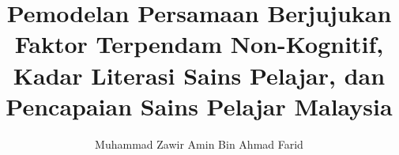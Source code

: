 \documentclass[bahasam,nohyphen]{GayaUKM}
\title{Pemodelan Persamaan Berjujukan Faktor Terpendam Non-Kognitif, Kadar Literasi Sains Pelajar, dan Pencapaian Sains Pelajar Malaysia}
\author{Muhammad Zawir Amin Bin Ahmad Farid}
\begin{document}
\maketitle

\frontmatter
\declaration








\tableofcontents\clearpage
\listoffigures\clearpage
\listoftables\clearpage




\mainmatter







\appendix


\end{document}

